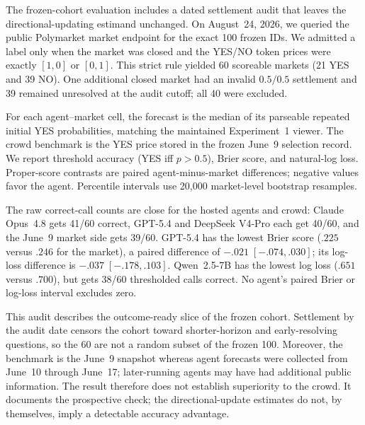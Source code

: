 The frozen-cohort evaluation includes a dated settlement audit that leaves the
directional-updating estimand unchanged. On August~24, 2026, we queried the public
Polymarket market endpoint for the exact 100 frozen IDs. We admitted a label only
when the market was closed and the YES/NO token prices were exactly
\([1,0]\) or \([0,1]\).  This strict rule yielded 60 scoreable markets
(21 YES and 39 NO). One additional closed market had an invalid \(0.5/0.5\)
settlement and 39 remained unresolved at the audit cutoff; all 40 were excluded.

For each agent--market cell, the forecast is the median of its parseable repeated
initial YES probabilities, matching the maintained Experiment~1 viewer.  The crowd
benchmark is the YES price stored in the frozen June~9 selection record.  We report
threshold accuracy (YES iff \(p>0.5\)), Brier score, and natural-log loss.  Proper-score
contrasts are paired agent-minus-market differences; negative values favor the
agent.  Percentile intervals use 20,000 market-level bootstrap resamples.

\begin{center}
\begin{minipage}{\linewidth}
\centering
{}
\label{tab:exp1-resolved-outcomes}
\scriptsize
\resizebox{\linewidth}{!}{%

}
\end{minipage}
\end{center}

The raw correct-call counts are close for the hosted agents and crowd:
Claude Opus~4.8 gets 41/60 correct, GPT-5.4 and DeepSeek V4-Pro each get
40/60, and the June~9 market side gets 39/60.  GPT-5.4 has the lowest Brier
score (\(.225\) versus \(.246\) for the market), a paired difference of
\(-.021\;[-.074,.030]\); its log-loss difference is
\(-.037\;[-.178,.103]\).  Qwen~2.5-7B has the lowest log loss (\(.651\)
versus \(.700\)), but gets 38/60 thresholded calls correct.  No agent's paired
Brier or log-loss interval excludes zero.

This audit describes the outcome-ready slice of the frozen cohort. Settlement by
the audit date censors the cohort toward shorter-horizon and early-resolving
questions, so the 60 are not a random subset of the frozen 100.  Moreover, the
benchmark is the June~9 snapshot whereas agent forecasts were collected from
June~10 through June~17; later-running agents may have had additional public
information.  The result therefore does not establish superiority to the crowd.
It documents the prospective check; the directional-update estimates do not, by
themselves, imply a detectable accuracy advantage.

